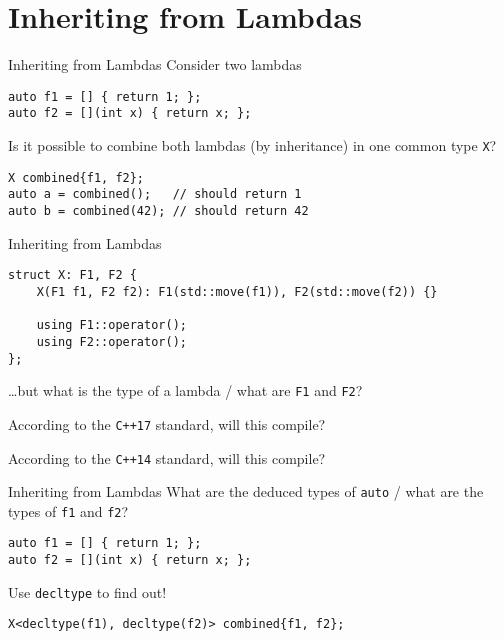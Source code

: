 \begin{frame}
    \centering
    \scalebox{3}{Inheriting from Lambdas}
\end{frame}

\section{Inheriting from Lambdas}

\begin{frame}[fragile]{Inheriting from Lambdas}
    Consider two lambdas
    \begin{lstlisting}
auto f1 = [] { return 1; };
auto f2 = [](int x) { return x; };
    \end{lstlisting}

    Is it possible to combine both lambdas (by inheritance) in one common type \texttt{X}?
    \begin{lstlisting}
X combined{f1, f2};
auto a = combined();   // should return 1
auto b = combined(42); // should return 42
    \end{lstlisting}
\end{frame}

\begin{frame}[fragile]{Inheriting from Lambdas}
    \begin{lstlisting}
struct X: F1, F2 {
    X(F1 f1, F2 f2): F1(std::move(f1)), F2(std::move(f2)) {}

    using F1::operator();
    using F2::operator();
};
    \end{lstlisting}
    \ldots but what is the type of a lambda / what are \texttt{F1} and \texttt{F2}?
\end{frame}

\begin{frame}[fragile]{According to the \texttt{C++17} standard, will this compile?}
\end{frame}

\begin{frame}[fragile]{According to the \texttt{C++14} standard, will this compile?}

\end{frame}

\begin{frame}[fragile]{Inheriting from Lambdas}
    What are the deduced types of \texttt{auto} / what are the types of \texttt{f1} and \texttt{f2}?
    \begin{lstlisting}
auto f1 = [] { return 1; };
auto f2 = [](int x) { return x; };
    \end{lstlisting}
    Use \texttt{decltype} to find out!
    \begin{lstlisting}
X<decltype(f1), decltype(f2)> combined{f1, f2};
    \end{lstlisting}
\end{frame}

